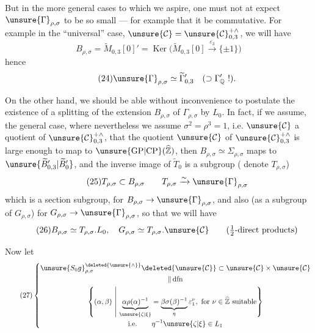 
But in the more general cases to which we aspire, one must not at  expect $\unsure{\Gamma}_{\rho,\sigma}$ to be so small --- for example that it be commutative.
For example in the ``universal'' case, $\unsure{\mathcal{C}}=\unsure{\mathcal{C}}_{0,3}^{+\wedge}$, we will have
\[
\tag{23}
B_{\rho,\sigma}=\widetilde{M}_{0,3}[0]'=
\operatorname{Ker}\bigl(\widetilde{M}_{0,3}[0]\xrightarrow{\varepsilon_3}\{\pm1\}\bigr)
\]
hence
\[
\tag{24}
\unsure{\Gamma}_{\rho,\sigma}\simeq\widetilde{\Gamma}_{0,3}'
\quad(\supset\Gamma_{\mathbb{Q}}'\ !).
\]

On the other hand, we should be able without inconvenience to postulate the existence of a  splitting of the extension $B_{\rho,\sigma}$ of $\Gamma_{\rho,\sigma}$ by $L_0$.
In fact, if we assume,  
 the general case, where nevertheless we assume $\sigma^2=\rho^3=1$, i.e. $\unsure{\mathcal{C}}$ a quotient of $\unsure{\mathcal{C}}_{0,3}^{+\wedge}$, that the quotient $\unsure{\mathcal{C}}$ of $\unsure{\mathcal{C}}_{0,3}^{+\wedge}$ is large enough to map to $\unsure{\mathrm{GP}|\mathrm{CP}}(\widehat{\mathbb{Z}})$, then  $B_{\rho,\sigma}\simeq\Sigma_{\rho,\sigma}$ maps to $\unsure{\widetilde{B}'_{0,3}|\widetilde{B}'_{0}}$, and the inverse image of $\widetilde{T}_0$ is a subgroup ( denote $T_{\rho,\sigma}$)
\[
\tag{25}
T_{\rho,\sigma}\subset B_{\rho,\sigma}\qquad
T_{\rho,\sigma}\xrightarrow{\sim}\unsure{\Gamma}_{\rho,\sigma}
\]
which is a section subgroup, for $B_{\rho,\sigma}\to\unsure{\Gamma}_{\rho,\sigma}$, and also (as a subgroup of $G_{\rho,\sigma}$) for $G_{\rho,\sigma}\to\unsure{\Gamma}_{\rho,\sigma}$, so that we will have
\[
\tag{26}
B_{\rho,\sigma}\simeq T_{\rho,\sigma}.L_0,\quad
G_{\rho,\sigma}\simeq T_{\rho,\sigma}.\unsure{\mathcal{C}}
\qquad\text{($\tfrac12$-direct products)}
\]


Now let
\[
\tag{27}
\left\{
\begin{gathered}
\unsure{S_0g}_{\rho,\sigma}^{\deleted{\unsure{\wedge}}}
\deleted{\unsure{\mathcal{C}}}\subset
\unsure{\mathcal{C}}\times\unsure{\mathcal{C}}
\\[-0.3ex]
\Vert\,\mathrm{dfn}
\\
\left\{(\alpha,\beta)\ \middle|\
\underbrace{\alpha\rho(\alpha)^{-1}}_{\unsure{\zeta|\xi}}
=\underbrace{\beta\sigma(\beta)^{-1}}_{\eta}\varepsilon_1^\nu,
\ \text{for }\nu\in\widehat{\mathbb{Z}}\ \text{suitable}\right\}
\\[-0.3ex]
\text{i.e.}\qquad \eta^{-1}\unsure{\zeta|\xi}\in L_1
\end{gathered}
\right.
\]

